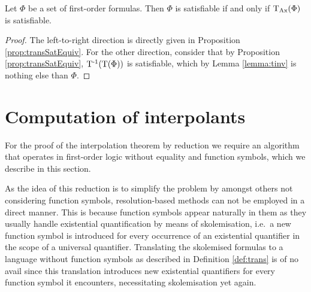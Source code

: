 \begin{corr}
	Let $\Phi$ be a set of first-order formulas.
	Then $\Phi$ is satisfiable if and only if $\operatorname{\operatorname{T}_{Ax}}(\Phi)$ is satisfiable.
\end{corr}
\begin{proof}
	The left-to-right direction is directly given in Proposition \ref{prop:transSatEquiv}.
	For the other direction, consider that by Proposition \ref{prop:transSatEquiv}, $\operatorname{T^{-1}}(\operatorname{T}(\Phi))$ is satisfiable, which by Lemma \ref{lemma:tinv} is nothing else than $\Phi$.
\end{proof}



\section{Computation of interpolants}

For the proof of the interpolation theorem by reduction we require an algorithm that operates in first-order logic without equality and function symbols, which we describe in this section.

\begin{remark}
	As the idea of this reduction is to simplify the problem by amongst others not considering function symbols,
	resolution-based methods can not be employed in a direct manner.
	This is because function symbols appear naturally in them as they usually handle existential quantification by means of skolemisation, i.e.~a new function symbol is introduced for every occurrence of an existential quantifier in the scope of a universal quantifier.
	Translating the skolemised formulas to a language without function symbols as described in Definition \ref{def:trans} is of no avail since this translation introduces new existential quantifiers for every function symbol it encounters, necessitating skolemisation yet again.
\end{remark}


